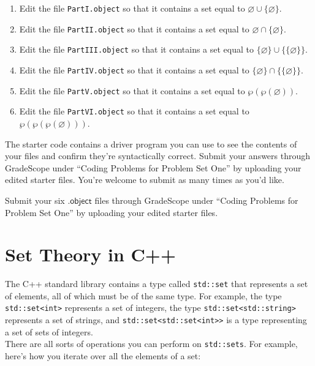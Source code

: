 \documentclass{article}
\renewcommand{\(}{\left(}
\renewcommand{\)}{\right)}
\theoremstyle{plain}
\theoremstyle{plain}
\theoremstyle{definition}
\begin{document}
\begin{enumerate}[label*=\roman*.,ref=\roman*]
	\item Edit the file \texttt{PartI.object} so that it contains a set equal to $\varnothing \cup \{\varnothing\}$.
    	\item Edit the file  \texttt{PartII.object} so that it contains a set equal to $\varnothing \cap \{\varnothing\}$.
    	\item Edit the file  \texttt{PartIII.object} so that it contains a set equal to $\{\varnothing\} \cup \{\{\varnothing\}\}$.
    	\item Edit the file  \texttt{PartIV.object} so that it contains a set equal to $\{\varnothing\} \cap \{\{\varnothing\}\}$.
    	\item Edit the file  \texttt{PartV.object} so that it contains a set equal to $\wp(\wp(\varnothing))$.
    	\item Edit the file  \texttt{PartVI.object} so that it contains a set equal to $\wp(\wp(\wp(\varnothing)))$.
\end{enumerate}

The starter code contains a driver program you can use to see the contents of your files and confirm they're syntactically correct. Submit your answers through GradeScope under ``Coding Problems for Problem Set One'' by uploading your edited starter files. You're welcome to submit as many times as you'd like.

\begin{shaded}
Submit your six $\mathsf{.object}$ files through GradeScope under ``Coding Problems for Problem Set One'' by uploading your edited starter files. 
\end{shaded}

\pagebreak

\section{Set Theory in C++}

The C++ standard library contains a type called \texttt{std::set} that represents a set of elements, all of which must be of the same type. For example, the type \texttt{std::set<int>} represents a set of integers, the type \texttt{std::set<std::string>} represents a set of strings, and \texttt{std::set<std::set<int>>} is a type representing a set of sets of integers. \\

There are all sorts of operations you can perform on \texttt{std::sets}. For example, here's how you iterate over all the elements of a set:
\end{document}
